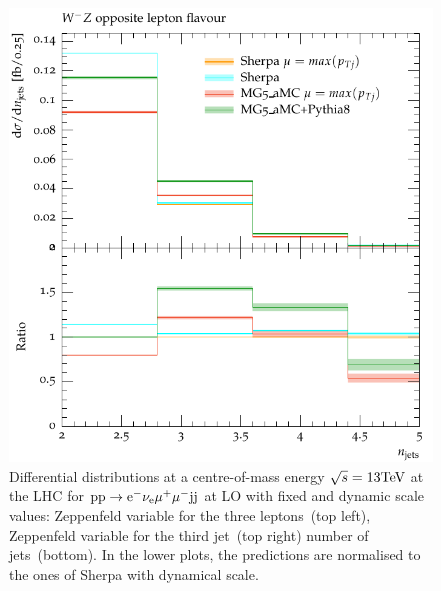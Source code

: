 \begin{figure}[htbp]
\begin{center}
   \includegraphics[scale=0.65]{figs/dyn_WmZ_OF_nJets}
\caption{Differential distributions at a centre-of-mass energy $\sqrt{s}=13{\rm TeV}$ at the LHC for ${\rm p} {\rm p} \to {\rm e}^-  \nu_{\rm e}  \mu^+ \mu^- {\rm j} {\rm j}$ at LO with fixed and dynamic scale values: 
                Zeppenfeld variable for the three leptons~(top left),
                Zeppenfeld variable for the third jet~(top right)
                number of jets~(bottom).
                In the lower plots, the predictions are normalised to the ones of {\sc Sherpa} with dynamical scale.
                }
\label{vbs_fig_shower_2b}
\end{center}
\end{figure}

